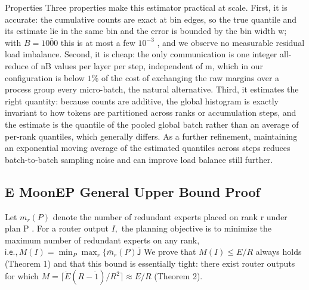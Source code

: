 \documentclass[
  10
]{article}
\begin{document}
Properties Three properties make this estimator practical at scale.
First, it is accurate: the cumulative counts are exact at bin edges, so
the true quantile and its estimate lie in the same bin and the error is
bounded by the bin width w; with \(B = 1 \mathrm { \bar { 0 0 0 } }\)
this is at most a few \(1 0 ^ { - 3 }\) , and we observe no measurable
residual load imbalance. Second, it is cheap: the only communication is
one integer all-reduce of nB values per layer per step, independent of
m, which in our configuration is below \(1 \%\) of the cost of
exchanging the raw margins over a process group every micro-batch, the
natural alternative. Third, it estimates the right quantity: because
counts are additive, the global histogram is exactly invariant to how
tokens are partitioned across ranks or accumulation steps, and the
estimate is the quantile of the pooled global batch rather than an
average of per-rank quantiles, which generally differs. As a further
refinement, maintaining an exponential moving average of the estimated
quantiles across steps reduces batch-to-batch sampling noise and can
improve load balance still further.

\subsection{E MoonEP General Upper Bound
Proof}\label{e-moonep-general-upper-bound-proof}

Let \(m _ { r } ( P )\) denote the number of redundant experts placed on
rank r under plan P . For a router output \(I ,\) the planning objective
is to minimize the maximum number of redundant experts on any rank,
\(\mathsf { i . e . , } M ( I ) = \operatorname* { m i n } _ { P } \operatorname* { m a x } _ { r } \{ \bar { m } _ { r } ( P ) \bar { \mathsf { J } }\)
We prove that \(M ( I ) \leq E / R\) always holds (Theorem 1) and that
this bound is essentially tight: there exist router outputs for which
\(M = \lceil \dot { E } ( R - \dot { 1 } ) / R ^ { 2 } \rceil \stackrel { . } { \approx } E / R\)
(Theorem 2).
\end{document}
